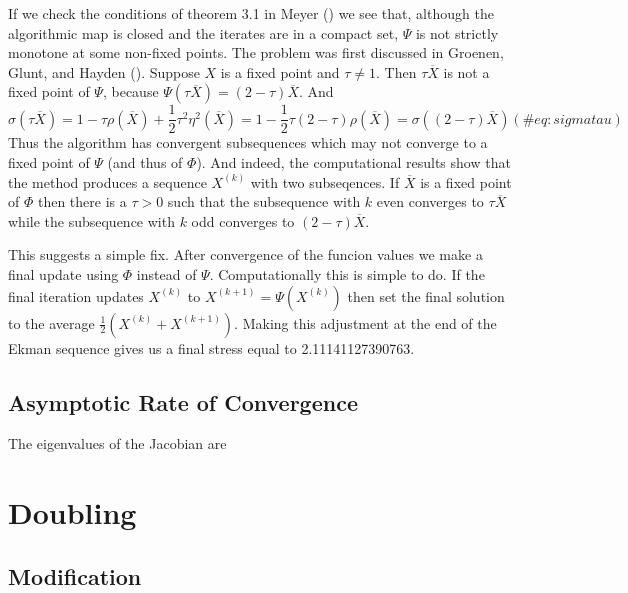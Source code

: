 \documentclass[
  12pt,
  letterpaper,
  DIV=11,
  numbers=noendperiod]{scrartcl}
\begin{document}
If we check the conditions of theorem 3.1 in Meyer
() we see that, although the algorithmic
map is closed and the iterates are in a compact set, \(\Psi\) is not
strictly monotone at some non-fixed points. The problem was first
discussed in Groenen, Glunt, and Hayden
(). Suppose \(X\) is a fixed
point and \(\tau\not= 1\). Then \(\tau\overline{X}\) is not a fixed
point of \(\Psi\), because
\(\Psi(\tau\overline{X})=(2-\tau)\overline{X}\). And \begin{equation}
\sigma(\tau\overline{X})=1-\tau\rho(\overline{X})+\frac12\tau^2\eta^2(\overline{X})=
1-\frac12\tau(2-\tau)\rho(\overline{X})=\sigma((2-\tau)\overline{X})
(\#eq:sigmatau)
\end{equation} Thus the algorithm has convergent subsequences which may
not converge to a fixed point of \(\Psi\) (and thus of \(\Phi\)). And
indeed, the computational results show that the method produces a
sequence \(X^{(k)}\) with two subseqences. If \(\overline{X}\) is a
fixed point of \(\Phi\) then there is a \(\tau>0\) such that the
subsequence with \(k\) even converges to \(\tau\overline{X}\) while the
subsequence with \(k\) odd converges to \((2-\tau)\overline{X}\).

This suggests a simple fix. After convergence of the funcion values we
make a final update using \(\Phi\) instead of \(\Psi\). Computationally
this is simple to do. If the final iteration updates \(X^{(k)}\) to
\(X^{(k+1)}=\Psi(X^{(k)})\) then set the final solution to the average
\(\frac12(X^{(k)}+X^{(k+1)})\). Making this adjustment at the end of the
Ekman sequence gives us a final stress equal to 2.11141127390763.

\subsection{Asymptotic Rate of
Convergence}\label{asymptotic-rate-of-convergence-4}

The eigenvalues of the Jacobian are

\section{Doubling}\label{doubling}

\subsection{Modification}\label{modification-4}
\end{document}
